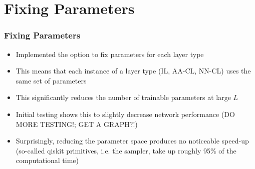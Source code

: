 \documentclass{beamer}
\begin{document}
\section{Fixing Parameters}

\begin{frame}
\frametitle{Fixing Parameters}
\begin{itemize}
\item Implemented the option to \alert{fix parameters for each layer type}
\item This means that each instance of a layer type (IL, AA-CL, NN-CL) uses the same set of parameters 
\item This significantly \alert{reduces the number of trainable parameters} at large $L$
\item Initial testing shows this to slightly decrease network performance (DO MORE TESTING!; GET A GRAPH?!) 
\item Surprisingly, reducing the parameter space \alert{produces no noticeable speed-up} (so-called qiskit primitives, i.e. the sampler, take up roughly 95\% of the computational time)
\end{itemize}
\end{frame}
\end{document}
